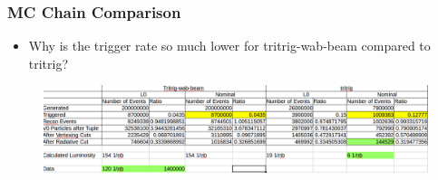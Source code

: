 \documentclass{beamer}
\begin{document}

\begin{frame}
\frametitle{MC Chain Comparison}
\begin{itemize}
\item Why is the trigger rate so much lower for tritrig-wab-beam compared to tritrig?
\end{itemize}
\begin{figure}
\includegraphics[width=1.0\linewidth]{figs/norm_xs.png}
\end{figure}

\end{frame}

\end{document}
